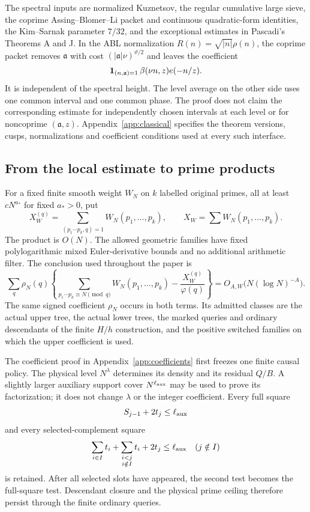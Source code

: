 The spectral inputs are normalized Kuznetsov, the regular cumulative
large sieve, the coprime Assing--Blomer--Li packet and continuous
quadratic-form identities, the Kim--Sarnak parameter $7/32$, and the
exceptional estimates in Pascadi's Theorems A and J.  In the ABL
normalization $R(n)=\sqrt{|n|}\rho(n)$, the coprime packet removes
$\mathfrak a$ with cost $(|\mathfrak a|\nu)^{\vartheta/2}$ and leaves
the coefficient
\[
 {\bf1}_{(n,\mathfrak a)=1}\,
       \beta(\nu n,z)e(-n/z).
\]
It is independent of the spectral height.  The level average on the
other side uses one common interval and one common phase.  The proof
does not claim the corresponding estimate for independently chosen
intervals at each level or for noncoprime $(\mathfrak a,z)$.
Appendix~\ref{app:classical} specifies the theorem versions, cusps,
normalizations and coefficient conditions used at every such interface.

\subsection{From the local estimate to prime products}

For a fixed finite smooth weight $W_N$ on $k$ labelled original primes,
all at least $cN^{a_*}$ for fixed $a_*>0$, put
\[
 X_W^{(q)}=\sum_{(p_1\cdots p_k,q)=1}W_N(p_1,\ldots,p_k),
 \qquad X_W=\sum W_N(p_1,\ldots,p_k).
\]
The product is $O(N)$.  The allowed geometric families have fixed
polylogarithmic mixed Euler-derivative bounds and no additional
arithmetic filter.  The conclusion used throughout the paper is
\begin{equation}
 \sum_q\rho_N(q)
 \left\{\sum_{p_1\cdots p_k\equiv N\pmod q}W_N(p_1,\ldots,p_k)
            -\frac{X_W^{(q)}}{\varphi(q)}\right\}
       =O_{A,W}\bigl(N(\log N)^{-A}\bigr).
 \label{eq:current-PP}
\end{equation}
The same signed coefficient $\rho_N$ occurs in both terms.  Its
admitted classes are the actual upper tree, the actual lower trees,
the marked queries and ordinary descendants of the finite $H/h$
construction, and the positive switched families on which the upper
coefficient is used.

The coefficient proof in Appendix~\ref{app:coefficients} first freezes
one finite causal policy.  The physical level $N^\lambda$ determines
its density and its residual $Q/B$.  A slightly larger auxiliary
support cover $N^{\ell_{\rm aux}}$ may be used to prove its
factorization; it does not change $\lambda$ or the integer coefficient.
Every full square
\[
 S_{j-1}+2t_j\le\ell_{\rm aux}
\]
and every selected-complement square
\[
 \sum_{i\in I}t_i+
       \sum_{\substack{i<j\\i\notin I}}t_i+2t_j
       \le\ell_{\rm aux}\quad(j\notin I)
\]
is retained.  After all selected slots have appeared, the second test
becomes the full-square test.  Descendant closure and the physical
prime ceiling therefore persist through the finite ordinary queries.

